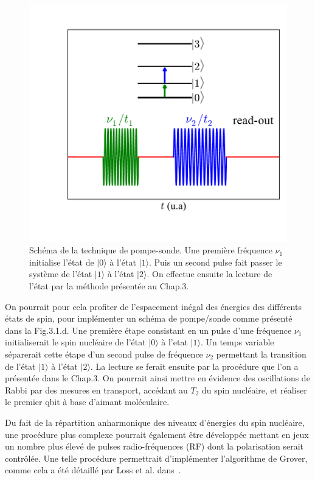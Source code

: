 \begin{figure}[h!]
\parbox{7cm}{
\includegraphics[scale=0.45]{Conclusion/spin_nuc_man/spin_nuc_man.pdf} 
}
\parbox{6.5cm}{\caption{Schéma de la technique de pompe-sonde. Une première fréquence $\nu_1$ initialise l'état de $|0\rangle$ à l'état $|1\rangle$. Puis un second pulse fait passer le système de l'état $|1\rangle$ à l'état $|2\rangle$. On effectue ensuite la lecture de l'état par la méthode présentée au Chap.3.}
\label{spin_nuc_man}
}
\end{figure}

On pourrait pour cela profiter de l'espacement inégal des énergies des différents états de spin, pour implémenter un schéma de pompe/sonde comme présenté dans la Fig.3.1.d. Une première étape consistant en un pulse d'une fréquence $\nu_1$ initialiserait le spin nucléaire de l’état $|0\rangle$ à l'etat $|1\rangle$. Un temps variable séparerait cette étape d'un second pulse de fréquence $\nu_2$ permettant la transition de l’état $|1\rangle$ à l’état $|2\rangle$. La lecture se ferait ensuite par la procédure que l'on a présentée dans le Chap.3. On pourrait ainsi mettre en évidence des oscillations de Rabbi par des mesures en transport, accédant au $T_2$ du spin nucléaire, et réaliser le premier qbit à base d'aimant moléculaire.

Du fait de la répartition anharmonique des niveaux d’énergies du spin nucléaire, une procédure plus complexe pourrait également être développée mettant en jeux un nombre plus élevé de pulses radio-fréquences (RF) dont la polarisation serait contrôlée. Une telle procédure permettrait d’implémenter l'algorithme de Grover, comme cela a été détaillé par Loss et al. dans~\cite{Leuenberger2003}.

